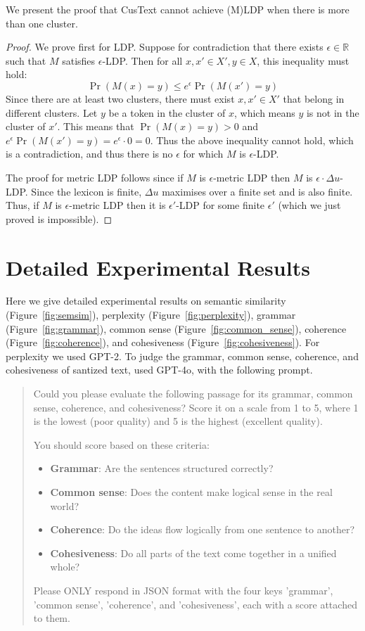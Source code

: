 We present the proof that CusText cannot achieve (M)LDP when there is more than one cluster.
\begin{proof}
    We prove first for LDP.  Suppose for contradiction that there exists $\epsilon\in \mathbb{R}$ such that $M$ satisfies $\epsilon$-LDP. Then for all $x, x' \in X', y \in X$, this inequality must hold: 
    $$
        \Pr(M(x) = y) \leq e^\epsilon \Pr(M(x') = y)
    $$
    Since there are at least two clusters, there must exist $x, x' \in X'$ that belong in different clusters. Let $y$ be a token in the cluster of $x$, which means $y$ is not in the cluster of $x'$. This means that $\Pr(M(x) = y) > 0$ and $e^\epsilon \Pr(M(x') = y) = e^\epsilon \cdot 0 = 0$. Thus the above inequality cannot hold, which is a contradiction, and thus there is no  $\epsilon$ for which $M$ is $\epsilon$-LDP.

     The proof for metric LDP follows since if $M$ is $\epsilon$-metric LDP then  $M$ is $\epsilon\cdot \Delta u$-LDP. Since the lexicon is finite, $\Delta u$ maximises over a finite set and is also finite. Thus, if $M$ is $\epsilon$-metric LDP then it is $\epsilon'$-LDP for some finite $\epsilon'$ (which we just proved is impossible).    
\end{proof}


\section{Detailed Experimental Results}

Here we give detailed experimental results on 
semantic similarity (Figure~\ref{fig:semsim}),
perplexity (Figure~\ref{fig:perplexity}),
grammar (Figure~\ref{fig:grammar}),
common sense (Figure~\ref{fig:common_sense}), 
coherence (Figure~\ref{fig:coherence}), and 
cohesiveness (Figure~\ref{fig:cohesiveness}).
For perplexity we used GPT-2. To judge the grammar, common sense, coherence, and cohesiveness of santized text, used GPT-4o, with the following prompt. 


{\em
\begin{quote}
Could you please evaluate the following passage for its grammar, common sense, coherence, and cohesiveness? Score it on a scale from 1 to 5, where 1 is the lowest (poor quality) and 5 is the highest (excellent quality).

You should score based on these criteria:
\begin{itemize}
    \item \textbf{Grammar}: Are the sentences structured correctly?
    \item \textbf{Common sense}: Does the content make logical sense in the real world?
    \item \textbf{Coherence}: Do the ideas flow logically from one sentence to another?
    \item \textbf{Cohesiveness}: Do all parts of the text come together in a unified whole?
\end{itemize}

Please ONLY respond in JSON format with the four keys 'grammar', 'common sense', 'coherence', and 'cohesiveness', each with a score attached to them.
\end{quote}
}

